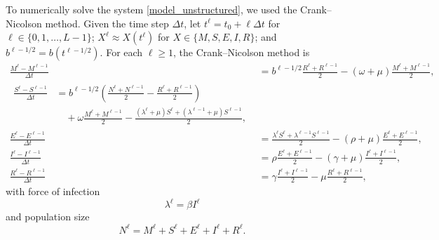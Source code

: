 \documentclass{jpmarticle}
\let\subequationsorig\subequations%
\let\endsubequationsorig\endsubequations%
\renewenvironment{subequations}{
  \subequationsorig
  \renewcommand{\theequation}{\theparentequation.\arabic{equation}}
}{
  \endsubequationsorig
}
\begin{document}
\begin{subequations}
  To numerically solve the system \eqref{model_unstructured}, we used
  the Crank--Nicolson method. Given the time step $\Delta t$, let
  $t^{\ell} = t_0 + \ell \Delta t$ for $\ell \in \{0, 1, \ldots, L - 1\}$;
  $X^{\ell} \approx X(t^{\ell})$ for $X \in \{M, S, E, I, R\}$;
  and $b^{\ell - 1 / 2} = b(t^{\ell - 1 / 2})$.
  For each $\ell \geq 1$, the Crank--Nicolson method is
  \begin{align}
    \frac{M^{\ell} - M^{\ell - 1}}{\Delta t}
    &=
    b^{\ell - 1 / 2}
    \frac{R^{\ell} + R^{\ell - 1}}{2}
    - (\omega + \mu)
    \frac{M^{\ell} + M^{\ell - 1}}{2},
    \\
    \begin{split}
      \frac{S^{\ell} - S^{\ell - 1}}{\Delta t}
      &=
      b^{\ell - 1 / 2}
      \left(\frac{N^{\ell} + N^{\ell - 1}}{2}
        - \frac{R^{\ell} + R^{\ell - 1}}{2}\right)
      \\ & \quad {}
      + \omega \frac{M^{\ell} + M^{\ell - 1}}{2}
      - \frac{(\lambda^{\ell} + \mu) S^{\ell}
        + (\lambda^{\ell - 1} + \mu) S^{\ell - 1}}{2},
    \end{split}
    \\
    \frac{E^{\ell} - E^{\ell - 1}}{\Delta t}
    &=
    \frac{\lambda^{\ell} S^{\ell} + \lambda^{\ell - 1} S^{\ell- 1}}{2}
    - (\rho + \mu)
    \frac{E^{\ell} + E^{\ell - 1}}{2},
    \\
    \frac{I^{\ell} - I^{\ell - 1}}{\Delta t}
    &=
    \rho \frac{E^{\ell} + E^{\ell - 1}}{2}
    - (\gamma + \mu) \frac{I^{\ell} + I^{\ell - 1}}{2},
    \\
    \frac{R^{\ell} - R^{\ell - 1}}{\Delta t}
    &=
    \gamma \frac{I^{\ell} + I^{\ell - 1}}{2}
    - \mu \frac{R^{\ell} + R^{\ell - 1}}{2},
  \end{align}
  with force of infection
  \begin{equation}
    \lambda^{\ell} = \beta I^{\ell}
  \end{equation}
  and population size
  \begin{equation}
    N^{\ell} = M^{\ell} + S^{\ell} + E^{\ell} + I^{\ell} + R^{\ell}.
  \end{equation}
\end{subequations}
\end{document}
